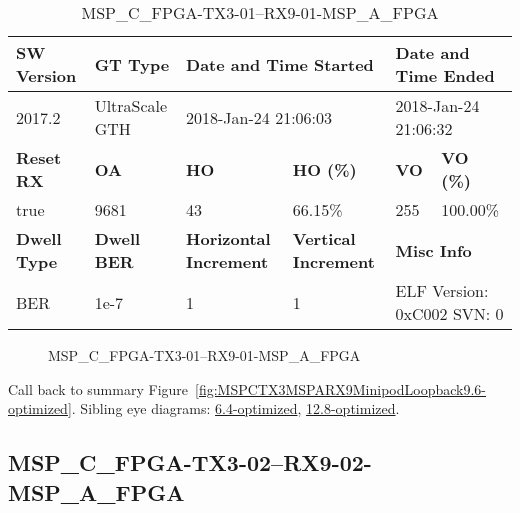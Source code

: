 \begin{table}[h]
\centering
\caption{MSP\_C\_FPGA-TX3-01--RX9-01-MSP\_A\_FPGA}
\label{tab:MSPCFPGATX301RX901MSPAFPGA9.6-optimized}
\begin{tabular}{@{}|l|l|l|l|l|l|@{}}
\toprule
\textbf{SW Version}                & \textbf{GT Type}   & \multicolumn{2}{l|}{\textbf{Date and Time Started}}            & \multicolumn{2}{l|}{\textbf{Date and Time Ended}}        \\ \midrule
2017.2                       & UltraScale GTH          & \multicolumn{2}{l|}{2018-Jan-24 21:06:03}                   & \multicolumn{2}{l|}{2018-Jan-24 21:06:32}               \\ \midrule
\textbf{Reset RX}                  & \textbf{OA} & \textbf{HO}   & \textbf{HO (\%)} & \textbf{VO} & \textbf{VO (\%)} \\ \midrule
true & 9681        & 43          & 66.15\%        & 255        & 100.00\%       \\ \midrule
\textbf{Dwell Type}                & \textbf{Dwell BER} & \textbf{Horizontal Increment} & \textbf{Vertical Increment}    & \multicolumn{2}{l|}{\textbf{Misc Info}}                  \\ \midrule
BER                            & 1e-7        & 1        & 1           & \multicolumn{2}{l|}{ELF Version: 0xC002 SVN: 0}                         \\ \bottomrule
\end{tabular}
\end{table}

\begin{figure}[h]
\caption{MSP\_C\_FPGA-TX3-01--RX9-01-MSP\_A\_FPGA} \label{fig:MSPCFPGATX301RX901MSPAFPGA9.6-optimized}
\end{figure}

Call back to summary Figure~\ref{fig:MSPCTX3MSPARX9MinipodLoopback9.6-optimized}.
Sibling eye diagrams: \hyperref[sec:MSPCFPGATX301RX901MSPAFPGA6.4-optimized]{6.4-optimized}, \hyperref[sec:MSPCFPGATX301RX901MSPAFPGA12.8-optimized]{12.8-optimized}.

\clearpage
\newpage


\subsection{MSP\_C\_FPGA-TX3-02--RX9-02-MSP\_A\_FPGA}\label{sec:MSPCFPGATX302RX902MSPAFPGA9.6-optimized}

